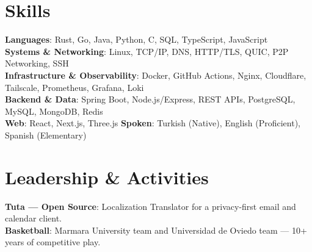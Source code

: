 \documentclass[a4paper,10pt]{article}
\begin{document}
\section{Skills}
  \begin{itemize}[leftmargin=0.15in, label={}, topsep=5pt]
    \small{\item{
      \textbf{Languages}{: Rust, Go, Java, Python, C, SQL, TypeScript, JavaScript} \\ \vspace{3pt}
      \textbf{Systems \& Networking}{: Linux, TCP/IP, DNS, HTTP/TLS, QUIC, P2P Networking, SSH} \\ \vspace{3pt}
      \textbf{Infrastructure \& Observability}{: Docker, GitHub Actions, Nginx, Cloudflare, Tailscale, Prometheus, Grafana, Loki} \\ \vspace{3pt}
      \textbf{Backend \& Data}{: Spring Boot, Node.js/Express, REST APIs, PostgreSQL, MySQL, MongoDB, Redis} \\ \vspace{3pt}
      \textbf{Web}{: React, Next.js, Three.js \hspace{2em} \textbf{Spoken}{: Turkish (Native), English (Proficient), Spanish (Elementary)}}
    }}
  \end{itemize}
\section{Leadership \& Activities}
  \begin{itemize}[leftmargin=0.15in, label={}, topsep=5pt]
    \small{\item{
      \textbf{Tuta --- Open Source}{: Localization Translator for a privacy-first email and calendar client.} \\ \vspace{3pt}
      \textbf{Basketball}{: Marmara University team and Universidad de Oviedo team --- 10+ years of competitive play.}
    }}
  \end{itemize}
\end{document}
